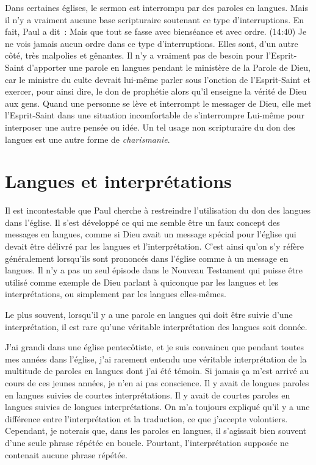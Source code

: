 Dans certaines églises, le sermon est interrompu par des paroles en langues.
 Mais il n'y a vraiment aucune base scripturaire soutenant ce type
 d'interruptions. En fait, Paul a dit~: \og Mais que tout se fasse
 avec bienséance et avec ordre. \fg{}(14:40)
 Je ne vois jamais aucun ordre dans ce type d'interruptions.
 Elles sont, d'un autre côté, très malpolies et gênantes.
 Il n'y a vraiment pas de besoin pour l'Esprit-Saint d'apporter une parole
 en langues pendant le ministère de la Parole de Dieu, car le ministre
 du culte devrait lui-même parler sous l'onction de l'Esprit-Saint
 et exercer, pour ainsi dire, le don de prophétie alors qu'il enseigne
 la vérité de Dieu aux gens. Quand une personne se lève et interrompt
 le messager de Dieu, elle met l'Esprit-Saint dans une situation
 incomfortable de s'interrompre Lui-même pour interposer une autre pensée
 ou idée. Un tel usage non scripturaire du don des langues est une autre
 forme de \emph{charismanie}.


\section{Langues et interpr\'etations}

Il est incontestable que Paul cherche à restreindre l'utilisation
 du don des langues dans l'église. Il s'est développé ce qui me semble
 être un faux concept des \og messages \fg{} en langues,
 comme si Dieu avait un message spécial pour l'église qui devait être délivré
 par les langues et l'interprétation. C'est ainsi qu'on s'y réfère
 généralement lorsqu'ils sont prononcés dans l'église
 \ocadr comme à un message en langues.
 Il n'y a pas un seul épisode dans le Nouveau Testament
 qui puisse être utilisé comme exemple de Dieu parlant à quiconque
 par les langues et les interprétations, ou simplement par les langues
 elles-mêmes.

Le plus souvent, lorsqu'il y a une parole en langues qui doit être suivie
 d'une interprétation, il est rare qu'une véritable interprétation
 des langues soit donnée.

J'ai grandi dans une église pentecôtiste, et je suis convaincu que pendant
 toutes mes années dans l'église, j'ai rarement entendu une véritable
 interprétation de la multitude de paroles en langues dont j'ai été témoin.
 Si jamais ça m'est arrivé au cours de ces jeunes années, je n'en ai pas conscience.
 Il y avait de longues paroles en langues suivies de courtes interprétations.
 Il y avait de courtes paroles en langues suivies de longues interprétations.
 On m'a toujours expliqué qu'il y a une différence entre l'interprétation
 et la traduction, ce que j'accepte volontiers. Cependant, je noterais que,
 dans les paroles en langues, il s'agissait bien souvent d'une seule phrase
 répétée en boucle. Pourtant, l'interprétation supposée ne contenait aucune phrase
 répétée.


